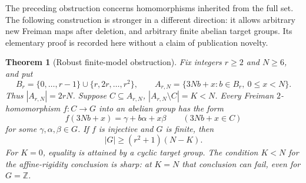 \documentclass[11pt]{article}
\newtheorem{theorem}{Theorem}[section]
\theoremstyle{definition}
\theoremstyle{remark}
\newcommand{\Z}{\mathbb Z}
\begin{document}
The preceding obstruction concerns homomorphisms inherited from the full
set. The following construction is stronger in a different direction:
it allows arbitrary new Freiman maps after deletion, and arbitrary finite
abelian target groups. Its elementary proof is recorded here without a
claim of publication novelty.

\begin{theorem}[Robust finite-model obstruction]
\label{thm:robust-cluster}
Fix integers $r\ge2$ and $N\ge6$, and put
\[
B_r=\{0,\ldots,r-1\}\cup\{r,2r,\ldots,r^2\},\qquad
A_{r,N}=\{3Nb+x:b\in B_r,\ 0\le x<N\}.
\]
Thus $|A_{r,N}|=2rN$. Suppose $C\subseteq A_{r,N}$,
$|A_{r,N}\setminus C|=K<N$.
Every Freiman $2$-homomorphism $f:C\to G$ into an abelian group has
the form
\[
f(3Nb+x)=\gamma+b\alpha+x\beta\qquad(3Nb+x\in C)
\]
for some $\gamma,\alpha,\beta\in G$. If $f$ is injective and $G$ is
finite, then
\begin{equation}\label{eq:robust-cluster-order}
|G|\ge(r^2+1)(N-K).
\end{equation}
For $K=0$, equality is attained by a cyclic target group.
The condition $K<N$ for the affine-rigidity conclusion is sharp:
at $K=N$ that conclusion can fail, even for $G=\Z$.
\end{theorem}
\end{document}
